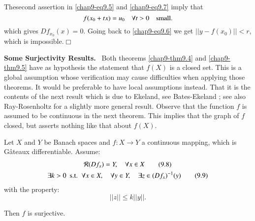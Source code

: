 The\pageoriginale second assertion in \eqref{chap9-eq9.5} and
\eqref{chap9-eq9.7} imply that
$$
f(x_{0}+tx)=u_{0}\quad \forall t>0\quad\text{small}.
$$
which gives $Df_{x_{0}}(x)=0$. Going back to \eqref{chap9-eq9.6} we
get $||y-f(x_{0})||<r$, which is impossible.\hfill$\Box$

\medskip
\noindent
{\bf Some Surjectivity Results.}~ Both theorems \ref{chap9-thm9.4} and
\ref{chap9-thm9.5} have as hypothesis the statement that $f(X)$ is a
closed set. This is a global assumption whose verification may cause
difficulties when applying those theorems. It would be preferable to
have local assumptions instead. That it is the contents of the next
result which is due to Ekeland, see Bates-Ekeland \cite{key7}; see
also Ray-Rosenholtz \cite{key69} for a slightly more general
result. Observe that the function $f$ is assumed to be continuous in
the next theorem. This implies that the graph of $f$ closed, but
asserts nothing like that about $f(X)$.

\begin{theorem}\label{chap9-thm9.6}
Let $X$ and $Y$ be Banach spaces and $f:X\to Y$ a continuous mapping,
which is G\^ateaux differentiable. Assume:
\begin{gather*}
\mathcal{R}(Df_{x})=Y,\quad \forall x\in X\tag{9.8}\label{chap9-eq9.8}\\
\exists k>0\text{~ s.t.~ }\forall x\in X,\quad \forall y\in Y,\quad \exists
z\in (Df_{x})^{-1}(y)\tag{9.9}\label{chap9-eq9.9}
\end{gather*}
with the property:
$$
||z||\leq k||y||.
$$

Then $f$ is surjective.
\end{theorem}

